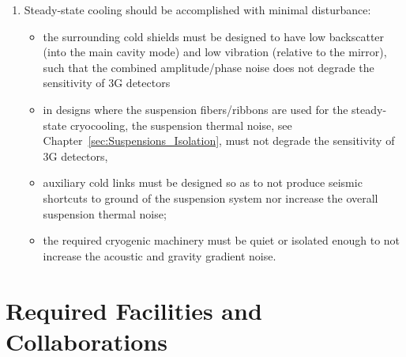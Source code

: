 \begin{enumerate}
\item Steady-state cooling should be accomplished with minimal disturbance:
      \begin{itemize}
        \item the surrounding cold shields must be designed to have low backscatter (into the main cavity mode) and low vibration (relative to the mirror), such that the combined amplitude/phase noise does not degrade the sensitivity of 3G detectors
        \item in designs where the suspension fibers/ribbons are used for the steady-state cryocooling, the suspension thermal noise, see Chapter~\ref{sec:Suspensions_Isolation}, must not degrade the sensitivity of 3G detectors,
        \item auxiliary cold links must be designed so as to not produce seismic shortcuts to ground of the suspension system nor increase the overall suspension thermal noise;
        \item the required cryogenic machinery must be quiet or isolated enough to not increase the acoustic and gravity gradient noise.
      \end{itemize}
\end{enumerate}

%


\section{Required Facilities and Collaborations}

